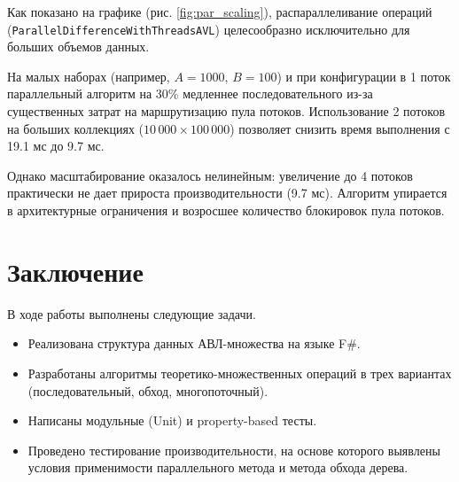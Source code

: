 \documentclass[a4paper,12pt]{article}
\begin{document}
Как показано на графике (рис. \ref{fig:par_scaling}), распараллеливание операций (\verb|ParallelDifferenceWithThreadsAVL|) целесообразно исключительно для больших объемов данных. 

На малых наборах (например, $A=1000$, $B=100$) и при конфигурации в 1 поток параллельный алгоритм на 30\% медленнее последовательного из-за существенных затрат на маршрутизацию пула потоков. Использование 2 потоков на больших коллекциях ($10\,000 \times 100\,000$) позволяет снизить время выполнения с 19.1 мс до 9.7 мс. 

Однако масштабирование оказалось нелинейным: увеличение до 4 потоков практически не дает прироста производительности (9.7 мс). Алгоритм упирается в архитектурные ограничения и возросшее количество блокировок пула потоков.

\section{Заключение}

В ходе работы выполнены следующие задачи.
\begin{itemize}
    \item Реализована структура данных АВЛ-множества на языке F\#.
    \item Разработаны алгоритмы теоретико-множественных операций в трех вариантах (последовательный, обход, многопоточный).
    \item Написаны модульные (Unit) и property-based тесты.
    \item Проведено тестирование производительности, на основе которого выявлены условия применимости параллельного метода и метода обхода дерева.
\end{itemize}
\end{document}
